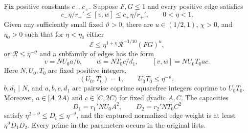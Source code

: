 \begin{proposition}\label{ar:extraction}
Fix positive constants $c_-,c_+$. Suppose $F,G\le1$ and every positive
edge satisfies
\[
 c_-\eta/r_+'\le[v,w]\le c_+\eta/r_+',\qquad 0<\eta<1.
\]
Given any sufficiently small fixed $\vartheta>0$, there are
$u\in(1/2,1)$, $\chi>0$, and $\eta_0>0$ such that for $\eta<\eta_0$
either
\begin{equation}\label{eq:small-saving}
 \mathcal E\le\eta^{1+\chi}\mathcal R^{-1/10}(FG)^u,
\end{equation}
or $\mathcal R\le\eta^{-\vartheta}$ and a subfamily of edges has the
form
\[
 v=NU_0a/b,\qquad w=NT_0c/d_1,\qquad
 [v,w]=NU_0T_0ac.
\]
Here $N,U_0,T_0$ are fixed positive integers,
\[
 (U_0,T_0)=1,\qquad U_0T_0\le\eta^{-\vartheta},
\]
$b,d_1\mid N$, and $a,b,c,d_1$ are pairwise coprime squarefree integers
coprime to $U_0T_0$. Moreover, $a\in[A,2A)$ and $c\in[C,2C)$ for fixed
dyadic $A,C$. The capacities
\[
 D_1=r_1'NU_0A^2,\qquad D_2=r_2'NT_0C^2
\]
satisfy $\eta^{2+\vartheta}\le D_i\le\eta^{-\vartheta}$, and the
captured normalized edge weight is at least $\eta^\vartheta D_1D_2$.
Every prime in the parameters occurs in the original lists.
\end{proposition}

